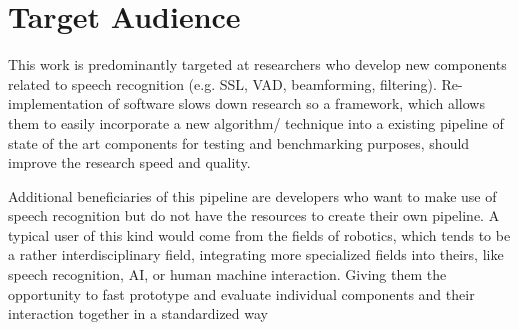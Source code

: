 \section{Target Audience}

This work is predominantly targeted at researchers who develop new components related to speech recognition (e.g. SSL, VAD, beamforming, filtering). 
Re-implementation of software slows down research so a framework, which allows them to easily incorporate a new algorithm/ technique into a existing pipeline of state of the art components for testing and benchmarking purposes, should improve the research speed and quality.

Additional beneficiaries of this pipeline are developers who want to make use of speech recognition but do not have the resources to create their own pipeline.
A typical user of this kind would come from the fields of robotics, which tends to be a rather interdisciplinary field, integrating more specialized fields into theirs, like speech recognition, AI, or human machine interaction.
Giving them the opportunity to fast prototype and evaluate individual components and their interaction together in a standardized way 